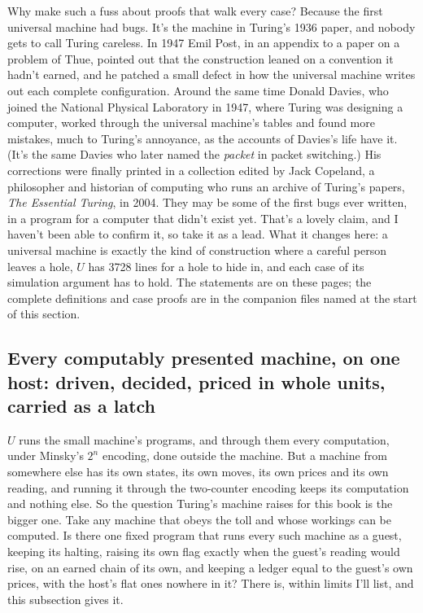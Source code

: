 \documentclass[11pt,twoside]{article}
\theoremstyle{thielethm}
\theoremstyle{thieledef}
\theoremstyle{thieledef}
\theoremstyle{thieledef}
\theoremstyle{thielethm}
\theoremstyle{thieleobs}
\theoremstyle{thielethm}
\begin{document}
Why make such a fuss about proofs that walk every case? Because the first universal machine had
bugs. It's the machine in Turing's 1936 paper, and nobody gets to call Turing careless. In 1947
Emil Post, in an appendix to a paper on a problem of Thue, pointed out that the construction
leaned on a convention it hadn't earned, and he patched a small defect in how the universal
machine writes out each complete configuration. Around the same time Donald Davies, who joined
the National Physical Laboratory in 1947, where Turing was designing a computer, worked through
the universal machine's tables and found more mistakes, much to Turing's annoyance, as the
accounts of Davies's life have it. (It's the same Davies who later named the
\emph{packet} in packet switching.) His corrections were finally printed in a collection edited by
Jack Copeland, a philosopher and historian of computing who runs an archive of Turing's papers,
\emph{The Essential Turing}, in 2004. They may be some of the first bugs
ever written, in a program for a computer that didn't exist yet. That's a lovely claim, and I
haven't been able to confirm it, so take it as a lead. What it changes here: a universal machine
is exactly the kind of construction where a careful person leaves a hole, $U$ has 3728 lines for
a hole to hide in, and each case of its simulation argument has to hold. The statements are on these
pages; the complete definitions and case proofs are in the companion files named
at the start of this section.

\subsection[Every computably presented machine, on one host]{Every computably presented machine, on one host: driven, decided, priced in whole units, carried as a latch}
\label{sec:presented-universal}

$U$ runs the small machine's programs, and through them every computation, under Minsky's $2^n$
encoding, done outside the machine. But a machine
from somewhere else has its own states, its own moves, its own prices and its own reading, and
running it through the two-counter encoding keeps its computation and nothing else. So the
question Turing's machine raises for this book is the bigger one. Take any machine that obeys
the toll and whose workings can be computed. Is there one fixed program that runs every such machine as a guest,
keeping its halting, raising its own flag exactly when the guest's reading would rise, on an
earned chain of its own, and keeping a ledger equal to the guest's own prices, with the host's
flat ones nowhere in it? There is, within limits I'll list, and this subsection gives it.
\end{document}
